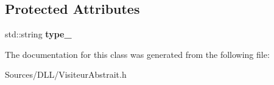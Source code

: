 \subsection*{Protected Attributes}
\begin{DoxyCompactItemize}
\item 
\hypertarget{class_visiteur_abstrait_a89cf9b9e3c1f2fe93d04d8640a2662c4}{}\label{class_visiteur_abstrait_a89cf9b9e3c1f2fe93d04d8640a2662c4} 
std\+::string {\bfseries type\+\_\+}
\end{DoxyCompactItemize}


The documentation for this class was generated from the following file\+:\begin{DoxyCompactItemize}
\item 
Sources/\+D\+L\+L/Visiteur\+Abstrait.\+h\end{DoxyCompactItemize}

